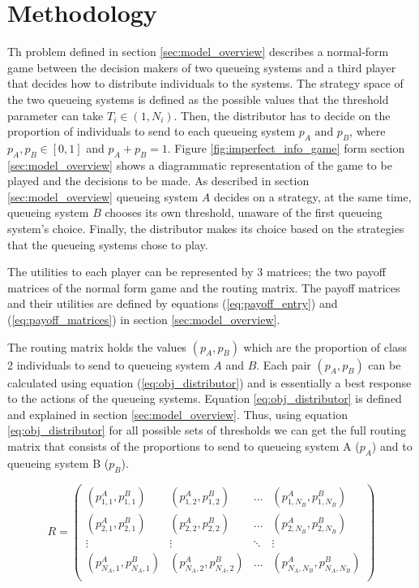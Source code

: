 \section{Methodology}\label{sec:methodology}

Th problem defined in section \ref{sec:model_overview} describes a normal-form
game between the decision makers of two queueing systems and a third player that 
decides how to distribute individuals to the systems.
The strategy space of the two queueing systems is defined as the possible values
that the threshold parameter can take \(T_i \in (1, N_i)\).
Then, the distributor has to decide on the proportion of individuals to send to 
each queueing system \(p_A \text{ and } p_B\), where \(p_A, p_B \in [0, 1] \)
and \(p_A + p_B = 1\).
Figure \ref{fig:imperfect_info_game} form section \ref{sec:model_overview} 
shows a diagrammatic representation of the game to be played and the decisions 
to be made.
As described in section \ref{sec:model_overview} queueing system \(A\) decides
on a strategy, at the same time, queueing system \(B\) chooses its own threshold, unaware 
of the first queueing system's choice.
Finally, the distributor makes its choice based on the strategies that the 
queueing systems chose to play. 

The utilities to each player can be represented by 3 matrices; the two payoff matrices of the 
normal form game and the routing matrix.
The payoff matrices and their utilities are defined by equations 
(\ref{eq:payoff_entry}) and (\ref{eq:payoff_matrices}) in section 
\ref{sec:model_overview}.

The routing matrix holds the values \((p_A, p_B)\) which are the proportion 
of class 2 individuals to send to queueing system \(A\) and \(B\).
Each pair \((p_A, p_B)\) can be calculated using equation 
(\ref{eq:obj_distributor}) and is essentially
a best response to the actions of the queueing systems.
Equation \ref{eq:obj_distributor} is defined and explained in section 
\ref{sec:model_overview}.
Thus, using equation \ref{eq:obj_distributor} for all possible sets of 
thresholds we can get the full routing matrix that consists of the proportions
to send to queueing system A (\(p_A\)) and to queueing system B (\(p_B\)).

\begin{equation}\label{eq:routing_matrix}
    R = 
    \begin{pmatrix}
        (p_{1,1}^A, p_{1,1}^B) & (p_{1,2}^A, p_{1,2}^B) & \dots & 
        (p_{1,N_B}^A, p_{1,N_B}^B) \\
        (p_{2,1}^A, p_{2,1}^B) & (p_{2,2}^A, p_{2,2}^B) & \dots & 
        (p_{2,N_B}^A, p_{2,N_B}^B) \\
        \vdots & \vdots & \ddots & \vdots \\
        (p_{N_A,1}^A, p_{N_A,1}^B) & (p_{N_A,2}^A, p_{N_A,2}^B) & \dots & 
        (p_{N_A,N_B}^A, p_{N_A,N_B}^B) \\
    \end{pmatrix}
\end{equation}

